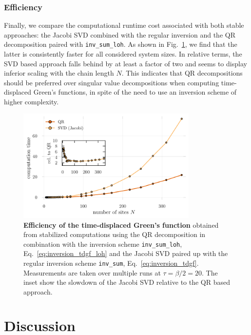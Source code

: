 \documentclass[submission, Phys]{SciPost}
\begin{document}
\subsubsection{Efficiency}\label{sec:tdgfbenchmark}

Finally, we compare the computational runtime cost associated with both stable approaches: the Jacobi SVD combined with the regular inversion and the QR decomposition paired with \texttt{inv\_sum\_loh}. As shown in Fig.~\ref{fig:tdgf_benchmark}, we find that the latter is consistently faster for all considered system sizes. In relative terms, the SVD based approach falls behind by at least a factor of two and seems to display inferior scaling with the chain length $N$.
This indicates that QR decompositions should be preferred over singular value decompositions when computing time-displaced Green's functions, in spite of the need to use an inversion scheme of higher complexity.

\begin{figure}
	\centering
	\includegraphics[width=0.8\textwidth]{figures/benchmark_jacobi_vs_qr_tdgf.pdf}
	\caption{\textbf{Efficiency of the time-displaced Green's function} obtained from stabilized computations using the QR decomposition in combination with the inversion scheme \texttt{inv\_sum\_loh}, Eq.~\eqref{eq:inversion_tdgf_loh} and the Jacobi SVD paired up with the regular inversion scheme \texttt{inv\_sum}, Eq.~\eqref{eq:inversion_tdgf}. Measurements are taken over multiple runs at $\tau = \beta/2 = 20$. The inset show the slowdown of the Jacobi SVD relative to the QR based approach. \label{fig:tdgf_benchmark}}
\end{figure}

\section{Discussion}\label{sec:discussion}
\end{document}
